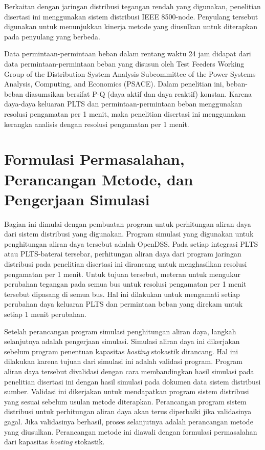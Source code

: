 Berkaitan dengan jaringan distribusi tegangan rendah yang digunakan, penelitian disertasi ini menggunakan sistem distribusi  IEEE 8500-node. Penyulang tersebut digunakan untuk menunjukkan kinerja metode yang diusulkan untuk diterapkan pada penyulang yang berbeda. 

Data permintaan-permintaan beban dalam rentang waktu 24 jam didapat dari data permintaan-permintaan beban yang disusun oleh Test Feeders Working Group of the Distribution System Analysis Subcommittee of the Power Systems Analysis, Computing, and Economics (PSACE). Dalam penelitian ini, beban-beban diasumsikan bersifat P-Q (daya aktif dan daya reaktif) konstan. Karena daya-daya keluaran PLTS dan permintaan-permintaan beban menggunakan resolusi pengamatan per 1 menit, maka penelitian disertasi ini menggunakan kerangka analisis dengan resolusi pengamatan per 1 menit.

\section{Formulasi Permasalahan, Perancangan Metode, dan Pengerjaan Simulasi}
Bagian ini dimulai dengan pembuatan program untuk perhitungan aliran daya dari sistem distribusi yang digunakan. Program simulasi yang digunakan untuk penghitungan aliran daya tersebut adalah OpenDSS. Pada setiap integrasi PLTS atau PLTS-baterai tersebar, perhitungan aliran daya dari program jaringan distribusi pada penelitian disertasi ini dirancang untuk menghasilkan resolusi pengamatan per 1 menit. Untuk tujuan tersebut, meteran untuk mengukur perubahan tegangan pada semua bus untuk resolusi pengamatan per 1 menit tersebut dipasang di semua bus. Hal ini dilakukan untuk mengamati setiap perubahan daya keluaran PLTS dan permintaan beban yang direkam untuk setiap 1 menit perubahan.

Setelah perancangan program simulasi penghitungan aliran daya, langkah selanjutnya adalah pengerjaan simulasi. Simulasi aliran daya ini dikerjakan sebelum program penentuan kapasitas \textit{\textit{hosting}} stokastik dirancang. Hal ini dilakukan karena tujuan dari simulasi ini adalah validasi program. Program aliran daya tersebut divalidasi dengan cara membandingkan hasil simulasi pada penelitian disertasi ini dengan hasil simulasi pada dokumen data sistem distribusi sumber. Validasi ini dikerjakan untuk mendapatkan program sistem distribusi yang sesuai sebelum usulan metode diterapkan. Perancangan program sistem distribusi untuk perhitungan aliran daya akan terus diperbaiki jika validasinya gagal. Jika validasinya berhasil, proses selanjutnya adalah perancangan metode yang diusulkan. Perancangan metode ini diawali dengan formulasi permasalahan dari kapasitas \textit{\textit{hosting}} stokastik.

